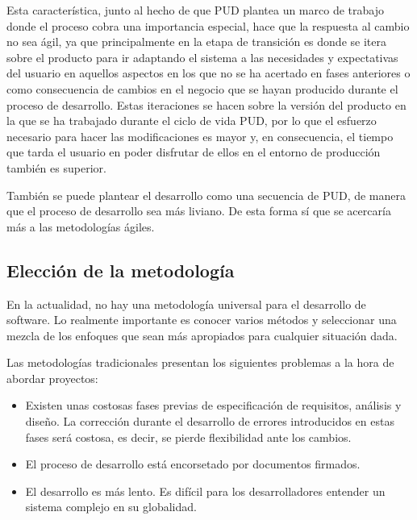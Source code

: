     Esta característica, junto al hecho de que PUD plantea un marco de trabajo donde el proceso cobra una importancia especial, hace que la respuesta al cambio no sea ágil, ya que principalmente en la etapa de transición es donde se itera sobre el producto para ir adaptando el sistema a las necesidades y expectativas del usuario en aquellos aspectos en los que no se ha acertado en fases anteriores o como consecuencia de cambios en el negocio que se hayan producido durante el proceso de desarrollo. Estas iteraciones se hacen sobre la versión del producto en la que se ha trabajado durante el ciclo de vida PUD, por lo que el esfuerzo necesario para hacer las modificaciones es mayor y, en consecuencia, el tiempo que tarda el usuario en poder disfrutar de ellos en el entorno de producción también es superior.

    También se puede plantear el desarrollo como una secuencia de PUD, de manera que el proceso de desarrollo sea más liviano. De esta forma sí que se acercaría más a las metodologías ágiles.
    

  \subsection{Elección de la metodología} %
    \label{sub:eleccion_de_la_metodologia}

    En la actualidad, no hay una metodología universal para el desarrollo de software. Lo realmente importante es conocer varios métodos y seleccionar una mezcla de los enfoques que sean más apropiados para cualquier situación dada.
    
    Las metodologías tradicionales presentan los siguientes problemas a la hora de abordar proyectos:
    
    \begin{itemize}
      \item Existen unas costosas fases previas de especificación de requisitos, análisis y diseño. La corrección durante el desarrollo de errores introducidos en estas fases será costosa, es decir, se pierde flexibilidad ante los cambios.
      \item El proceso de desarrollo está encorsetado por documentos firmados.
      \item El desarrollo es más lento. Es difícil para los desarrolladores entender un sistema complejo en su globalidad.
    \end{itemize}

